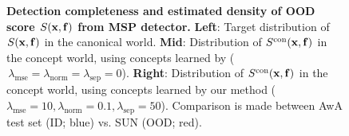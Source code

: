 \begin{figure}[h]
\centering
{} 
\caption{\textbf{Detection completeness and estimated density of OOD score $S(\mathbf{x}, \mathbf{f})$ from MSP detector.}
\textbf{Left}: Target distribution of $S(\mathbf{x}, \mathbf{f})$ in the canonical world. 
\textbf{Mid}: Distribution of $S^{\textrm{con}}(\mathbf{x}, \mathbf{f})$ in the concept world, using concepts learned by \citep{yeh2020completeness} ($\,\lambda_\textrm{mse} = \lambda_\textrm{norm} = \lambda_\textrm{sep} = 0$).
\textbf{Right}: Distribution of $S^{\textrm{con}}(\mathbf{x}, \mathbf{f})$ in the concept world, using concepts learned by our method ($\lambda_\textrm{mse} = 10, \lambda_\textrm{norm} = 0.1, \lambda_\textrm{sep} = 50$). Comparison is made between AwA test set (ID; blue) vs. SUN (OOD; red).}
\label{fig:score-distribution-msp}
\end{figure}
\fi

